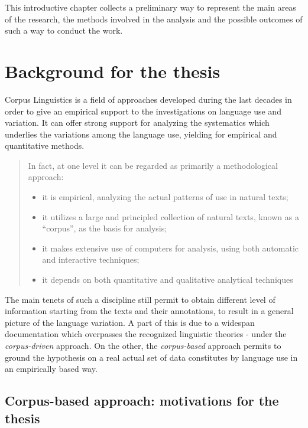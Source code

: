 \documentclass[
  a4paper,
  twoside,
  12pt,
  chapterprefix=false,
  bibliography=totocnumbered,
  listof=flat]{scrbook}
\providecommand{\tightlist}{%
  \setlength{\itemsep}{0pt}\setlength{\parskip}{0pt}}
\begin{document}
This introductive chapter collects a preliminary way to represent the main areas of the research, the methods involved in the analysis and the possible outcomes of such a way to conduct the work.

\hypertarget{background-for-the-thesis}{%
\section{Background for the thesis}\label{background-for-the-thesis}}

Corpus Linguistics is a field of approaches developed during the last decades in order to give an empirical support to the investigations on language use and variation. It can offer strong support for analyzing the systematics which underlies the variations among the language use, yielding for empirical and quantitative methods.

\begin{quote}
In fact, at one level it can be regarded as primarily a methodological approach:

\begin{itemize}
\tightlist
\item
  it is empirical, analyzing the actual patterns of use in natural texts;
\item
  it utilizes a large and principled collection of natural texts, known as a ``corpus'', as the basis for analysis;
\item
  it makes extensive use of computers for analysis, using both automatic and interactive techniques;
\item
  it depends on both quantitative and qualitative analytical techniques
  \citep{biber1998}
\end{itemize}
\end{quote}

The main tenets of such a discipline still permit to obtain different level of information starting from the texts and their annotations, to result in a general picture of the language variation. A part of this is due to a widespan documentation which overpasses the recognized linguistic theories - under the \emph{corpus-driven} approach.
On the other, the \emph{corpus-based} approach permits to ground the hypothesis on a real actual set of data constitutes by language use in an empirically based way.

\hypertarget{corpus-based-approach-motivations-for-the-thesis}{%
\subsection{Corpus-based approach: motivations for the thesis}\label{corpus-based-approach-motivations-for-the-thesis}}
\end{document}
